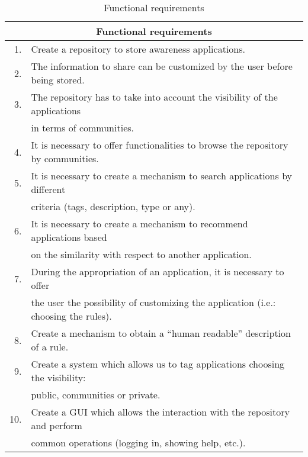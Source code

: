 \begin{table}[h!]
	\small
    \begin{center}
		\begin{tabular}{||r|l||}
		\hline \hline
		\multicolumn{2}{||c||}{\bfseries{Functional requirements}} \\
		\hline \hline
			1. & Create a repository to store awareness applications. \\
			\hline
			2. & The information to share can be customized by the user before being
			stored.\\
			\hline
			3. & The repository has to take into account the visibility of the
			applications\\
			   & in terms of communities.\\
			\hline
			4. & It is necessary to offer functionalities to browse the repository
			by communities.\\
			\hline
		 	5. & It is necessary to create a mechanism to search applications by
		 	different \\
		 	  & criteria (tags, description, type or any).	\\
			\hline
		 	6. & It is necessary to create a mechanism to recommend applications 
		 	based \\
		 	 & on the similarity with respect to another application.\\
			\hline
		 	7. & During the appropriation of an application, it is necessary to
		 	offer \\
		 	& the user the possibility of customizing the application (i.e.:
		 	choosing the rules).\\
		 	\hline
		 	8. & Create a mechanism to obtain a ``human readable'' description of a
		 	rule.\\
		 	\hline
		 	9. & Create a system which allows us to tag applications choosing the
		 	visibility:\\
		 	& public, communities or private.\\
			\hline
		 	10. & Create a GUI which allows the interaction with the repository 
		 	and perform \\
		 	& common operations (logging in, showing help, etc.).\\
		 	
		
		\hline \hline
		\end{tabular}
		\caption{\label{table:functional-requirements}Functional requirements}
	\end{center}
\end{table}


